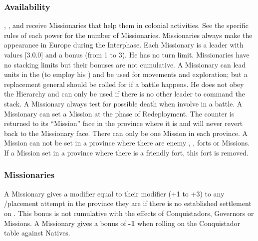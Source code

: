 \subsubsection{Availability}
\aparag \SPA, \POR, \FRA and \ANG receive Missionaries that help them in
colonial activities. See the specific rules of each power for the number of
Missionaries.
\bparag Missionaries always make the appearance in Europe during the
Interphase.
\aparag Each Missionary is a leader with values [3.0.0] and a bonus (from 1 to
3). He has no turn limit. Missionaries have no stacking limits but their
bonuses are not cumulative.
\bparag A Missionary can lead units in the \ROTW (to employ his \Man) and be
used for movements and exploration; but a replacement general should be rolled
for if a battle happens. He does not obey the Hierarchy and can only be used
if there is no other leader to command the stack. A Missionary always test for
possible death when involve in a battle.
\aparag A Missionary can set a Mission at the phase of Redeployment. The
counter is returned to its ``Mission'' face in the province where it is and
will never revert back to the Missionary face.
\bparag There can only be one Mission in each province. A Mission can not be
set in a province where there are enemy \COL, \TP, forts or Missions. If a
Mission set in a province where there is a friendly fort, this fort is
removed.


\subsubsection{Missionaries}
\aparag A Missionary gives a modifier equal to their modifier (+1 to +3) to
any \TP/\COL placement attempt in the province they are if there is no
established settlement on \Faceplus.
\bparag This bonus is not cumulative with the effects of Conquistadors,
Governors or Missions.
\aparag A Missionary gives a bonus of {\bf -1} when rolling on the
Conquistador table against Natives.


